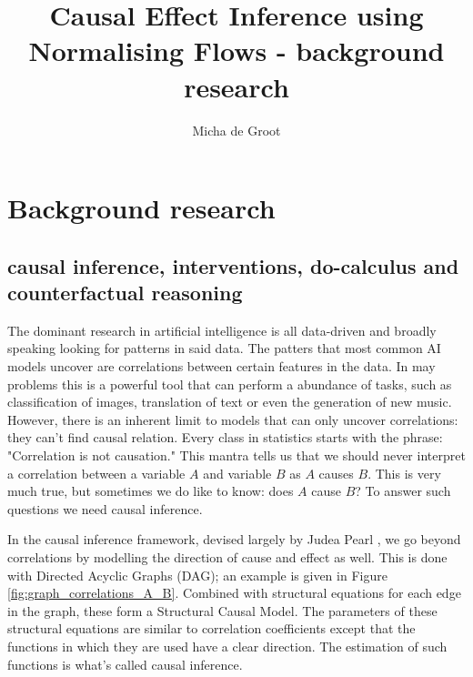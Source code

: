 \documentclass{article}
\title{Causal Effect Inference using Normalising Flows - background research}
\author{Micha de Groot}
\date
\begin{document}
\maketitle


\section{Background research}

\subsection{causal inference, interventions, do-calculus and counterfactual reasoning}
The dominant research in artificial intelligence is all data-driven and broadly speaking looking for patterns in said data. The patters that most common AI models uncover are correlations between certain features in the data. In may problems this is a powerful tool that can perform a abundance of tasks, such as classification of images, translation of text or even the generation of new music. However, there is an inherent limit to models that can only uncover correlations: they can't find causal relation. Every class in statistics starts with the phrase: "Correlation is not causation." This mantra tells us that we should never interpret a correlation between a variable $A$ and variable $B$ as $A$ causes $B$. This is very much true, but sometimes we do like to know: does $A$ cause $B$? To answer such questions we need causal inference. 

In the causal inference framework, devised largely by Judea Pearl\cite{pearl1995causal} \cite{pearl2009causal}, we go beyond correlations by modelling the direction of cause and effect as well. This is done with Directed Acyclic Graphs (DAG); an example is given in Figure \ref{fig:graph_correlations_A_B}. Combined with structural equations for each edge in the graph, these form a Structural Causal Model. The parameters of these structural equations are similar to correlation coefficients except that the functions in which they are used have a clear direction. The estimation of such functions is what's called causal inference. 
\end{document}
